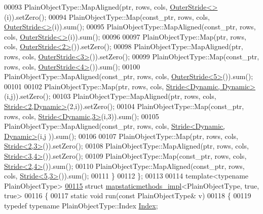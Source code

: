 \begin{DoxyCode}
00093     PlainObjectType::MapAligned(ptr, rows, cols, \hyperlink{class_eigen_1_1_outer_stride}{OuterStride<>}(i)).setZero();
00094     PlainObjectType::Map(const\_ptr, rows, cols, \hyperlink{class_eigen_1_1_outer_stride}{OuterStride<>}(i)).sum();
00095     PlainObjectType::MapAligned(const\_ptr, rows, cols, \hyperlink{class_eigen_1_1_outer_stride}{OuterStride<>}(i)).sum();
00096 
00097     PlainObjectType::Map(ptr, rows, cols, \hyperlink{class_eigen_1_1_outer_stride}{OuterStride<2>}()).setZero();
00098     PlainObjectType::MapAligned(ptr, rows, cols, \hyperlink{class_eigen_1_1_outer_stride}{OuterStride<3>}()).setZero();
00099     PlainObjectType::Map(const\_ptr, rows, cols, \hyperlink{class_eigen_1_1_outer_stride}{OuterStride<4>}()).sum();
00100     PlainObjectType::MapAligned(const\_ptr, rows, cols, \hyperlink{class_eigen_1_1_outer_stride}{OuterStride<5>}()).sum();
00101 
00102     PlainObjectType::Map(ptr, rows, cols, \hyperlink{group___core___module_class_eigen_1_1_stride}{Stride<Dynamic, Dynamic>}(i,j)).setZero();
00103     PlainObjectType::MapAligned(ptr, rows, cols, \hyperlink{group___core___module_class_eigen_1_1_stride}{Stride<2,Dynamic>}(2,i)).setZero();
00104     PlainObjectType::Map(const\_ptr, rows, cols, \hyperlink{group___core___module_class_eigen_1_1_stride}{Stride<Dynamic,3>}(i,3)).sum();
00105     PlainObjectType::MapAligned(const\_ptr, rows, cols, \hyperlink{group___core___module_class_eigen_1_1_stride}{Stride<Dynamic, Dynamic>}(i,j
      )).sum();
00106 
00107     PlainObjectType::Map(ptr, rows, cols, \hyperlink{group___core___module_class_eigen_1_1_stride}{Stride<2,3>}()).setZero();
00108     PlainObjectType::MapAligned(ptr, rows, cols, \hyperlink{group___core___module_class_eigen_1_1_stride}{Stride<3,4>}()).setZero();
00109     PlainObjectType::Map(const\_ptr, rows, cols, \hyperlink{group___core___module_class_eigen_1_1_stride}{Stride<2,4>}()).sum();
00110     PlainObjectType::MapAligned(const\_ptr, rows, cols, \hyperlink{group___core___module_class_eigen_1_1_stride}{Stride<5,3>}()).sum();
00111   \}
00112 \};
00113 
00114 \textcolor{keyword}{template}<\textcolor{keyword}{typename} PlainObjectType>
\hyperlink{structmapstaticmethods__impl_3_01_plain_object_type_00_01true_00_01true_01_4}{00115} \textcolor{keyword}{struct }\hyperlink{structmapstaticmethods__impl}{mapstaticmethods\_impl}<PlainObjectType, true, true>
00116 \{
00117   \textcolor{keyword}{static} \textcolor{keywordtype}{void} run(\textcolor{keyword}{const} PlainObjectType& v)
00118   \{
00119     \textcolor{keyword}{typedef} \textcolor{keyword}{typename} PlainObjectType::Index \hyperlink{namespace_eigen_a62e77e0933482dafde8fe197d9a2cfde}{Index};

\end{DoxyCode}
